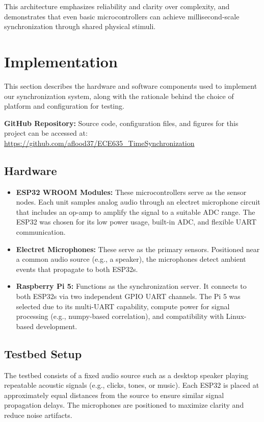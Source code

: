 \documentclass[sigconf]{acmart}
\begin{document}
This architecture emphasizes reliability and clarity over complexity, and demonstrates that even basic microcontrollers can achieve millisecond-scale synchronization through shared physical stimuli.


\section{Implementation}

This section describes the hardware and software components used to implement our synchronization system, along with the rationale behind the choice of platform and configuration for testing.

\noindent\textbf{GitHub Repository:} Source code, configuration files, and figures for this project can be accessed at: \\ \url{https://github.com/aflood37/ECE635_TimeSynchronization}


\subsection{Hardware}
\begin{itemize}
    \item \textbf{ESP32 WROOM Modules:} These microcontrollers serve as the sensor nodes. Each unit samples analog audio through an electret microphone circuit that includes an op-amp to amplify the signal to a suitable ADC range. The ESP32 was chosen for its low power usage, built-in ADC, and flexible UART communication.
    \item \textbf{Electret Microphones:} These serve as the primary sensors. Positioned near a common audio source (e.g., a speaker), the microphones detect ambient events that propagate to both ESP32s.
    \item \textbf{Raspberry Pi 5:} Functions as the synchronization server. It connects to both ESP32s via two independent GPIO UART channels. The Pi 5 was selected due to its multi-UART capability, compute power for signal processing (e.g., numpy-based correlation), and compatibility with Linux-based development.
\end{itemize}

\subsection{Testbed Setup}
The testbed consists of a fixed audio source such as a desktop speaker playing repeatable acoustic signals (e.g., clicks, tones, or music). Each ESP32 is placed at approximately equal distances from the source to ensure similar signal propagation delays. The microphones are positioned to maximize clarity and reduce noise artifacts.
\end{document}
